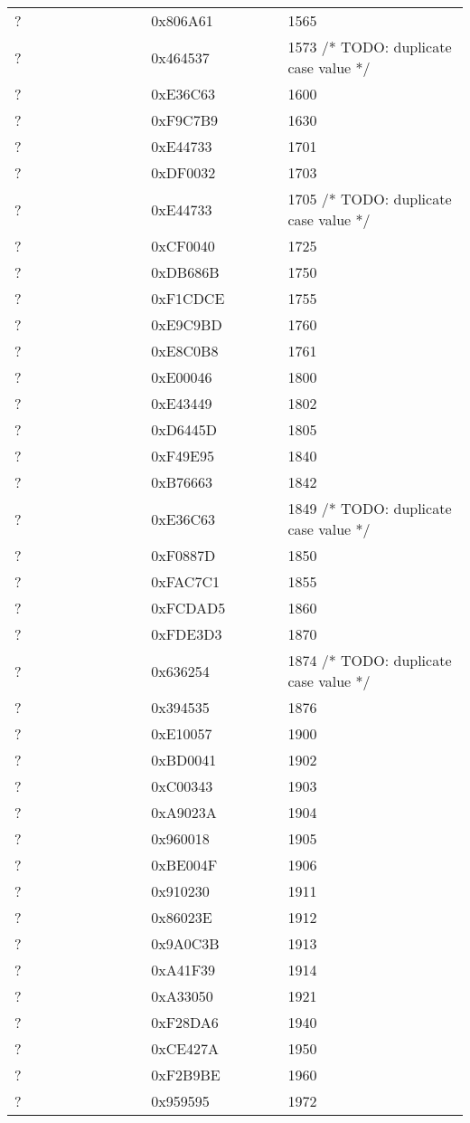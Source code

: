 \begin{longtable}{p{0.3\linewidth} p{0.3\linewidth} p{0.4\linewidth}}
? &  0x806A61 &  1565\\
? &  0x464537 &  1573 /* TODO: duplicate case value */\\
? &  0xE36C63 &  1600\\
? &  0xF9C7B9 &  1630\\
? &  0xE44733 &  1701\\
? &  0xDF0032 &  1703\\
? &  0xE44733 &  1705 /* TODO: duplicate case value */\\
? &  0xCF0040 &  1725\\
? &  0xDB686B &  1750\\
? &  0xF1CDCE &  1755\\
? &  0xE9C9BD &  1760\\
? &  0xE8C0B8 &  1761\\
? &  0xE00046 &  1800\\
? &  0xE43449 &  1802\\
? &  0xD6445D &  1805\\
? &  0xF49E95 &  1840\\
? &  0xB76663 &  1842\\
? &  0xE36C63 &  1849 /* TODO: duplicate case value */\\
? &  0xF0887D &  1850\\
? &  0xFAC7C1 &  1855\\
? &  0xFCDAD5 &  1860\\
? &  0xFDE3D3 &  1870\\
? &  0x636254 &  1874 /* TODO: duplicate case value */\\
? &  0x394535 &  1876\\
? &  0xE10057 &  1900\\
? &  0xBD0041 &  1902\\
? &  0xC00343 &  1903\\
? &  0xA9023A &  1904\\
? &  0x960018 &  1905\\
? &  0xBE004F &  1906\\
? &  0x910230 &  1911\\
? &  0x86023E &  1912\\
? &  0x9A0C3B &  1913\\
? &  0xA41F39 &  1914\\
? &  0xA33050 &  1921\\
? &  0xF28DA6 &  1940\\
? &  0xCE427A &  1950\\
? &  0xF2B9BE &  1960\\
? &  0x959595 &  1972\\

\end{longtable}
